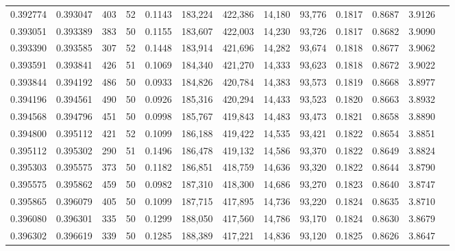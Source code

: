 \begin{tabular}{rrrrrrrrrrrrr}
0.392774 & 0.393047 &   403 &  52 &                                     0.1143 & 183,224 & 422,386 &  14,180 &  93,776 & 0.1817 & 0.8687 & 3.9126 \\
0.393051 & 0.393389 &   383 &  50 &                                     0.1155 & 183,607 & 422,003 &  14,230 &  93,726 & 0.1817 & 0.8682 & 3.9090 \\
0.393390 & 0.393585 &   307 &  52 &                                     0.1448 & 183,914 & 421,696 &  14,282 &  93,674 & 0.1818 & 0.8677 & 3.9062 \\
0.393591 & 0.393841 &   426 &  51 &                                     0.1069 & 184,340 & 421,270 &  14,333 &  93,623 & 0.1818 & 0.8672 & 3.9022 \\
0.393844 & 0.394192 &   486 &  50 &                                     0.0933 & 184,826 & 420,784 &  14,383 &  93,573 & 0.1819 & 0.8668 & 3.8977 \\
0.394196 & 0.394561 &   490 &  50 &                                     0.0926 & 185,316 & 420,294 &  14,433 &  93,523 & 0.1820 & 0.8663 & 3.8932 \\
0.394568 & 0.394796 &   451 &  50 &                                     0.0998 & 185,767 & 419,843 &  14,483 &  93,473 & 0.1821 & 0.8658 & 3.8890 \\
0.394800 & 0.395112 &   421 &  52 &                                     0.1099 & 186,188 & 419,422 &  14,535 &  93,421 & 0.1822 & 0.8654 & 3.8851 \\
0.395112 & 0.395302 &   290 &  51 &                                     0.1496 & 186,478 & 419,132 &  14,586 &  93,370 & 0.1822 & 0.8649 & 3.8824 \\
0.395303 & 0.395575 &   373 &  50 &                                     0.1182 & 186,851 & 418,759 &  14,636 &  93,320 & 0.1822 & 0.8644 & 3.8790 \\
0.395575 & 0.395862 &   459 &  50 &                                     0.0982 & 187,310 & 418,300 &  14,686 &  93,270 & 0.1823 & 0.8640 & 3.8747 \\
0.395865 & 0.396079 &   405 &  50 &                                     0.1099 & 187,715 & 417,895 &  14,736 &  93,220 & 0.1824 & 0.8635 & 3.8710 \\
0.396080 & 0.396301 &   335 &  50 &                                     0.1299 & 188,050 & 417,560 &  14,786 &  93,170 & 0.1824 & 0.8630 & 3.8679 \\
0.396302 & 0.396619 &   339 &  50 &                                     0.1285 & 188,389 & 417,221 &  14,836 &  93,120 & 0.1825 & 0.8626 & 3.8647 \\

\end{tabular}
